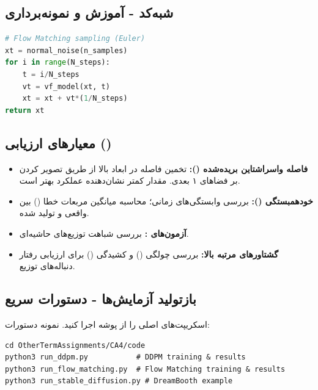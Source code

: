 \begin{latin}
\subsection{شبه‌کد - آموزش و نمونه‌برداری}
\begin{latin}
\begin{lstlisting}[language=Python]
# Flow Matching sampling (Euler)
xt = normal_noise(n_samples)
for i in range(N_steps):
    t = i/N_steps
    vt = vf_model(xt, t)
    xt = xt + vt*(1/N_steps)
return xt
\end{lstlisting}
\end{latin}



\subsection{معیارهای ارزیابی ()}
\begin{itemize}
    \item \textbf{فاصله واسراشتاین بریده‌شده ():} تخمین فاصله  در ابعاد بالا از طریق تصویر کردن بر فضاهای ۱ بعدی. مقدار کمتر نشان‌دهنده عملکرد بهتر است.
    \item \textbf{خودهمبستگی ():} بررسی وابستگی‌های زمانی؛ محاسبه میانگین مربعات خطا () بین  واقعی و تولید شده.
    \item \textbf{آزمون‌های :} بررسی شباهت توزیع‌های حاشیه‌ای.
    \item \textbf{گشتاورهای مرتبه بالا:} بررسی چولگی () و کشیدگی () برای ارزیابی رفتار دنباله‌های توزیع.
\end{itemize}

\subsection{بازتولید آزمایش‌ها - دستورات سریع}
اسکریپت‌های اصلی را از پوشه  اجرا کنید. نمونه دستورات:
\begin{latin}
\begin{verbatim}
cd OtherTermAssignments/CA4/code
python3 run_ddpm.py           # DDPM training & results
python3 run_flow_matching.py  # Flow Matching training & results
python3 run_stable_diffusion.py # DreamBooth example
\end{verbatim}
\end{latin}




\end{latin}
